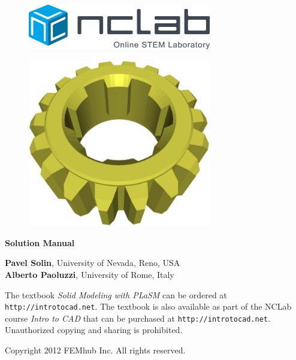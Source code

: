 \documentclass{article}
\newif\iffullversion
\begin{document}
\large

\vbox{}
\begin{figure}[!ht]
\includegraphics[width=8cm]{img/logo.png}
\vspace{18mm}
\end{figure}

\begin{figure}[!ht]
\begin{center}
\includegraphics[width=8cm]{img/plasm-frontpage.png}
\vspace{15mm}
\end{center}
\end{figure}

\begin{center}
{\Huge \bf Solution Manual}\\
\vbox{}
\vspace{1.4cm}
\iffullversion
\else
\centerline{\huge \color{red}{PREVIEW}}
\fi
\vfill
\vbox{}
\vspace{1cm}
\vfill
{\large
{\bf Pavel Solin}, University of Nevada, Reno, USA\\
{\bf Alberto Paoluzzi}, University of Rome, Italy
}
\end{center}
\newpage



\vbox{}
\vfill
\begin{center}
{
The textbook {\em Solid Modeling with PLaSM} 
can be ordered at {\tt http://introtocad.net}. The textbook 
is also available as part of the NCLab course {\em Intro to CAD} 
that can be purchased at {\tt http://introtocad.net}.
Unauthorized copying and sharing is prohibited.

}
\vfill

Copyright 2012 FEMhub Inc. All rights reserved.
\end{center}
\end{document}
